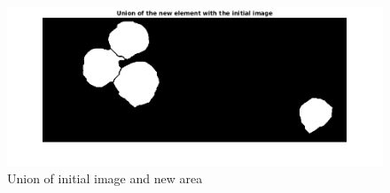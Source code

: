 \begin{figure}
	\begin{center}
		\centering
		\includegraphics[scale=0.5]{img/final/finalresult.png}
		\caption{Union of initial image and new area}
		\label{fig:unionimage}
	\end{center}
\end{figure}